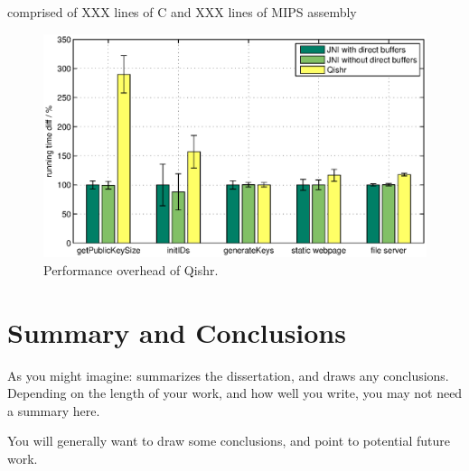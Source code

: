 \documentclass[a4paper,12pt,twoside,openright]{report}
\begin{document}
 comprised of XXX lines of C and XXX lines of MIPS assembly

\begin{figure}
	\centering
	\includegraphics[width=\textwidth]{chart_overhead.eps}
	\caption{Performance overhead of Qishr.}
\end{figure}

\chapter{Summary and Conclusions} 

As you might imagine: summarizes the dissertation, and draws 
any conclusions. Depending on the length of your work, and 
how well you write, you may not need a summary here. 

You will generally want to draw some conclusions, and point
to potential future work. 




\appendix
\singlespacing

 
 
\end{document}
